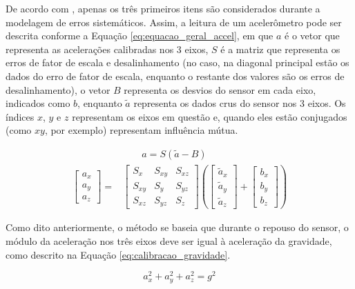 \documentclass[acronym, symbols, table, deposito]{fei}
\begin{document}
			De acordo com \textcite{hassan2020field}, apenas os três primeiros itens são considerados durante a modelagem de erros sistemáticos. Assim, a leitura de um acelerômetro pode ser descrita conforme a Equação \eqref{eq:equacao_geral_accel}, em que $a$ é o vetor que representa as acelerações calibradas nos 3 eixos, $S$ é a matriz que representa os erros de fator de escala e desalinhamento (no caso, na diagonal principal estão os dados do erro de fator de escala, enquanto o restante dos valores são os erros de desalinhamento), o vetor $B$ representa os desvios do sensor em cada eixo, indicados como $b$, enquanto $\tilde{a}$ representa os dados crus do sensor nos 3 eixos. Os índices $x$, $y$ e $z$ representam os eixos em questão e, quando eles estão conjugados (como $xy$, por exemplo) representam influência mútua.
			
			\begin{equation}\label{eq:equacao_geral_accel}
				\begin{split}
					&\quad \quad a = S(\tilde{a} - B) \\
					\begin{bmatrix}
						a_x \\ a_y \\ a_z
					\end{bmatrix} = 
					&\begin{bmatrix}
						S_x & S_{xy} & S_{xz} \\ S_{xy} & S_y & S_{yz} \\ S_{xz} & S_{yz} & S_z
					\end{bmatrix} \left(
					\begin{bmatrix}
						\tilde{a}_x \\ \tilde{a}_y \\ \tilde{a}_z
					\end{bmatrix} + 
					\begin{bmatrix}
						b_x \\ b_y \\ b_z
					\end{bmatrix}\right)
				\end{split}
			\end{equation}
			
			Como dito anteriormente, o método se baseia que durante o repouso do sensor, o módulo da aceleração nos três eixos deve ser igual à aceleração da gravidade, como descrito na Equação \eqref{eq:calibracao_gravidade}.
			
			\begin{equation} \label{eq:calibracao_gravidade}
				a_{x}^{2} + a_{y}^{2} + a_{z}^{2} = g^{2}
			\end{equation}
			
\end{document}
